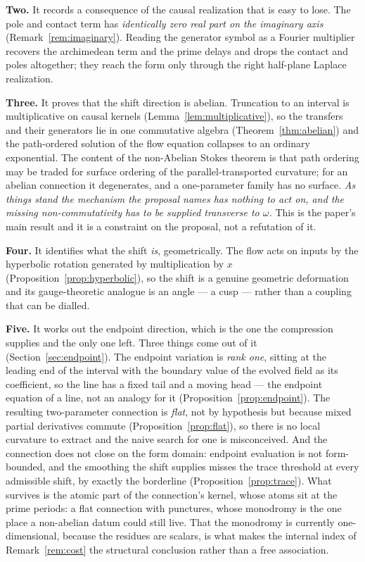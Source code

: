 \textbf{Two.} It records a consequence of the causal realization that is easy to
lose. The pole and contact term has \emph{identically zero real part on the
imaginary axis} (Remark~\ref{rem:imaginary}). Reading the generator symbol as a
Fourier multiplier recovers the archimedean term and the prime delays and drops
the contact and poles altogether; they reach the form only through the
right half-plane Laplace realization.

\textbf{Three.} It proves that the shift direction is abelian. Truncation to an
interval is multiplicative on causal kernels (Lemma~\ref{lem:multiplicative}), so
the transfers and their generators lie in one commutative algebra
(Theorem~\ref{thm:abelian}) and the path-ordered solution of the flow equation
collapses to an ordinary exponential. The content of the non-Abelian Stokes
theorem is that path ordering may be traded for surface ordering of the
parallel-transported curvature; for an abelian connection it degenerates, and a
one-parameter family has no surface. \emph{As things stand the mechanism the
proposal names has nothing to act on, and the missing non-commutativity has to be
supplied transverse to $\omega$.} This is the paper's main result and it is a
constraint on the proposal, not a refutation of it.

\textbf{Four.} It identifies what the shift \emph{is}, geometrically. The flow
acts on inputs by the hyperbolic rotation generated by multiplication by $x$
(Proposition~\ref{prop:hyperbolic}), so the shift is a genuine geometric
deformation and its gauge-theoretic analogue is an angle --- a cusp --- rather
than a coupling that can be dialled.

\textbf{Five.} It works out the endpoint direction, which is the one the
compression supplies and the only one left. Three things come out of it
(Section~\ref{sec:endpoint}). The endpoint variation is \emph{rank one}, sitting
at the leading end of the interval with the boundary value of the evolved field
as its coefficient, so the line has a fixed tail and a moving head --- the
endpoint equation of a line, not an analogy for it
(Proposition~\ref{prop:endpoint}). The resulting two-parameter connection is
\emph{flat}, not by hypothesis but because mixed partial derivatives commute
(Proposition~\ref{prop:flat}), so there is no local curvature to extract and the
naive search for one is misconceived. And the connection does not close on the
form domain: endpoint evaluation is not form-bounded, and the smoothing the shift
supplies misses the trace threshold at every admissible shift, by exactly the
borderline (Proposition~\ref{prop:trace}). What survives is the atomic part of
the connection's kernel, whose atoms sit at the prime periods: a flat connection
with punctures, whose monodromy is the one place a non-abelian datum could still
live. That the monodromy is currently one-dimensional, because the residues are
scalars, is what makes the internal index of Remark~\ref{rem:cost} the structural
conclusion rather than a free association.

